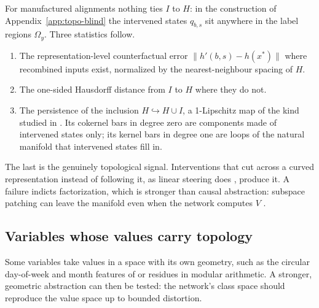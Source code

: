 \documentclass[11pt,a4paper]{article}
\begin{document}
For manufactured alignments nothing ties $I$ to $H$: in the construction of
Appendix~\ref{app:topo-blind} the intervened states $q_{b,s}$ sit anywhere in
the label regions $\Omega_y$. Three statistics follow.
\begin{enumerate}[leftmargin=*]
\item The representation-level counterfactual error $\|h'(b,s)-h(x^*)\|$
where recombined inputs exist, normalized by the nearest-neighbour spacing of
$H$.
\item The one-sided Hausdorff distance from $I$ to $H$ where they do not.
\item The persistence of the inclusion $H\hookrightarrow H\cup I$, a
1-Lipschitz map of the kind studied in \cite{gozzi2025}. Its cokernel bars in
degree zero are components made of intervened states only; its kernel bars in
degree one are loops of the natural manifold that intervened states fill in.
\end{enumerate}
The last is the genuinely topological signal. Interventions that cut across a
curved representation instead of following it, as linear steering does
\cite{bhalla2026}, produce it. A failure indicts factorization, which is
stronger than causal abstraction: subspace patching can leave the manifold
even when the network computes $V$ \cite{makelov2024}.

\subsection{Variables whose values carry topology}
\label{app:topo-struct}

Some variables take values in a space with its own geometry, such as the
circular day-of-week and month features of \cite{engels2025} or residues in
modular arithmetic. A stronger, geometric abstraction can then be tested: the
network's class space should reproduce the value space up to bounded
distortion.
\end{document}
